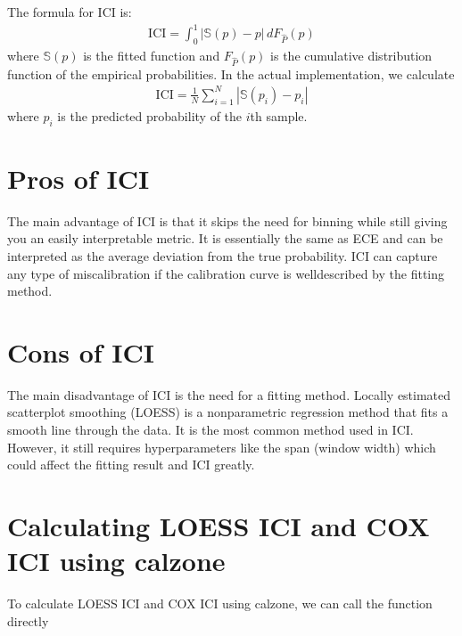 \documentclass[letterpaper,10pt,english]{sphinxmanual}
\begin{document}
\sphinxAtStartPar
The formula for ICI is:
\begin{equation*}
\begin{split}\text{ICI} = \int_0^1 |\mathbb{S}(p)-p| \, dF_{\hat{P}}(p)\end{split}
\end{equation*}
\sphinxAtStartPar
where \(\mathbb{S}(p)\) is the fitted function and \(F_{\hat{P}}(p)\) is the cumulative distribution function of the empirical probabilities. In the actual implementation, we calculate
\begin{equation*}
\begin{split}\text{ICI} = \frac{1}{N} \sum_{i=1}^N  |\mathbb{S}(p_i)-p_i|\end{split}
\end{equation*}
\sphinxAtStartPar
where \(p_i\) is the predicted probability of the \(i\)\sphinxhyphen{}th sample.


\section{Pros of ICI}
\label{\detokenize{notebooks/ici:Pros-of-ICI}}
\sphinxAtStartPar
The main advantage of ICI is that it skips the need for binning while still giving you an easily interpretable metric. It is essentially the same as ECE and can be interpreted as the average deviation from the true probability. ICI can capture any type of miscalibration if the calibration curve is well\sphinxhyphen{}described by the fitting method.


\section{Cons of ICI}
\label{\detokenize{notebooks/ici:Cons-of-ICI}}
\sphinxAtStartPar
The main disadvantage of ICI is the need for a fitting method. Locally estimated scatterplot smoothing (LOESS) is a non\sphinxhyphen{}parametric regression method that fits a smooth line through the data. It is the most common method used in ICI. However, it still requires hyperparameters like the span (window width) which could affect the fitting result and ICI greatly.


\section{Calculating LOESS ICI and COX ICI using calzone}
\label{\detokenize{notebooks/ici:Calculating-LOESS-ICI-and-COX-ICI-using-calzone}}
\sphinxAtStartPar
To calculate LOESS ICI and COX ICI using calzone, we can call the function directly
\end{document}
